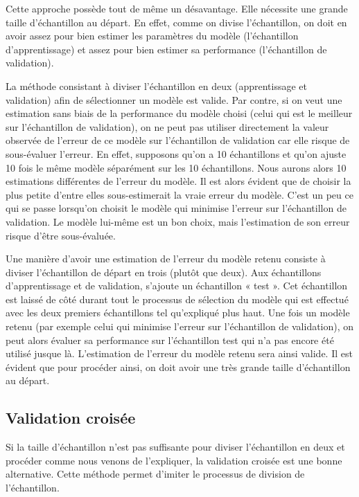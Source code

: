 \documentclass[
  11pt,
  letterpaper,
]{scrbook}
\theoremstyle{definition}
\theoremstyle{remark}
\begin{document}
Cette approche possède tout de même un désavantage. Elle nécessite une
grande taille d'échantillon au départ. En effet, comme on divise
l'échantillon, on doit en avoir assez pour bien estimer les paramètres
du modèle (l'échantillon d'apprentissage) et assez pour bien estimer sa
performance (l'échantillon de validation).

La méthode consistant à diviser l'échantillon en deux (apprentissage et
validation) afin de sélectionner un modèle est valide. Par contre, si on
veut une estimation sans biais de la performance du modèle choisi (celui
qui est le meilleur sur l'échantillon de validation), on ne peut pas
utiliser directement la valeur observée de l'erreur de ce modèle sur
l'échantillon de validation car elle risque de sous-évaluer l'erreur. En
effet, supposons qu'on a 10 échantillons et qu'on ajuste 10 fois le même
modèle séparément sur les 10 échantillons. Nous aurons alors 10
estimations différentes de l'erreur du modèle. Il est alors évident que
de choisir la plus petite d'entre elles sous-estimerait la vraie erreur
du modèle. C'est un peu ce qui se passe lorsqu'on choisit le modèle qui
minimise l'erreur sur l'échantillon de validation. Le modèle lui-même
est un bon choix, mais l'estimation de son erreur risque d'être
sous-évaluée.

Une manière d'avoir une estimation de l'erreur du modèle retenu consiste
à diviser l'échantillon de départ en trois (plutôt que deux). Aux
échantillons d'apprentissage et de validation, s'ajoute un échantillon «
test ». Cet échantillon est laissé de côté durant tout le processus de
sélection du modèle qui est effectué avec les deux premiers échantillons
tel qu'expliqué plus haut. Une fois un modèle retenu (par exemple celui
qui minimise l'erreur sur l'échantillon de validation), on peut alors
évaluer sa performance sur l'échantillon test qui n'a pas encore été
utilisé jusque là. L'estimation de l'erreur du modèle retenu sera ainsi
valide. Il est évident que pour procéder ainsi, on doit avoir une très
grande taille d'échantillon au départ.

\hypertarget{validation-croisuxe9e}{%
\subsection{Validation croisée}\label{validation-croisuxe9e}}

Si la taille d'échantillon n'est pas suffisante pour diviser
l'échantillon en deux et procéder comme nous venons de l'expliquer, la
validation croisée est une bonne alternative. Cette méthode permet
d'imiter le processus de division de l'échantillon.
\end{document}
